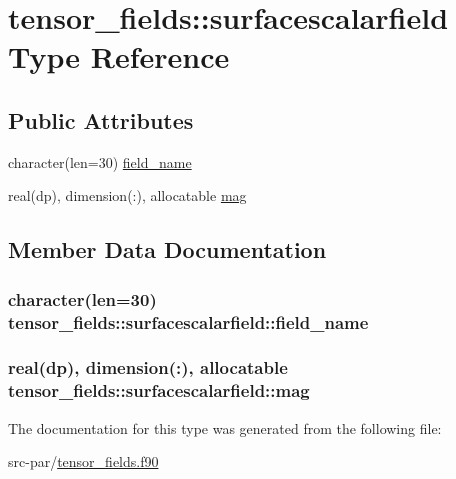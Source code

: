 \hypertarget{structtensor__fields_1_1surfacescalarfield}{\section{tensor\-\_\-fields\-:\-:surfacescalarfield Type Reference}
\label{structtensor__fields_1_1surfacescalarfield}
}
\subsection*{Public Attributes}
\begin{DoxyCompactItemize}
\item 
character(len=30) \hyperlink{structtensor__fields_1_1surfacescalarfield_a3746cd9590b9798da7c4a41b2295f647}{field\-\_\-name}
\item 
real(dp), dimension(\-:), allocatable \hyperlink{structtensor__fields_1_1surfacescalarfield_a2d5043ac01c9ddf75665bd5d72524113}{mag}
\end{DoxyCompactItemize}


\subsection{Member Data Documentation}
\hypertarget{structtensor__fields_1_1surfacescalarfield_a3746cd9590b9798da7c4a41b2295f647}{
\subsubsection[{field\-\_\-name}]{\setlength{\rightskip}{0pt plus 5cm}character(len=30) tensor\-\_\-fields\-::surfacescalarfield\-::field\-\_\-name}}\label{structtensor__fields_1_1surfacescalarfield_a3746cd9590b9798da7c4a41b2295f647}
\hypertarget{structtensor__fields_1_1surfacescalarfield_a2d5043ac01c9ddf75665bd5d72524113}{
\subsubsection[{mag}]{\setlength{\rightskip}{0pt plus 5cm}real(dp), dimension(\-:), allocatable tensor\-\_\-fields\-::surfacescalarfield\-::mag}}\label{structtensor__fields_1_1surfacescalarfield_a2d5043ac01c9ddf75665bd5d72524113}


The documentation for this type was generated from the following file\-:\begin{DoxyCompactItemize}
\item 
src-\/par/\hyperlink{tensor__fields_8f90}{tensor\-\_\-fields.\-f90}\end{DoxyCompactItemize}
